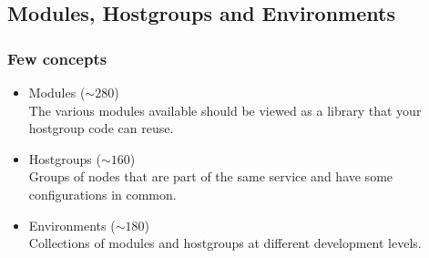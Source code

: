 \documentclass[aspectratio=169]{beamer}
\begin{document}
\subsection{Modules, Hostgroups and Environments}
\begin{frame}
    
    \frametitle{Few concepts}
    \begin{itemize}
        \item Modules ($\sim 280$) \\

        The various modules available should be viewed as a library 
        that your hostgroup code can reuse.
        \newline
        \item Hostgroups ($\sim 160$) \\

        Groups of nodes that are part of the same service and have 
        some configurations in common.
        \newline
        \item Environments ($\sim 180$) \\

        Collections of modules and hostgroups at different development levels.
    \end{itemize}

\end{frame}

\end{document}
